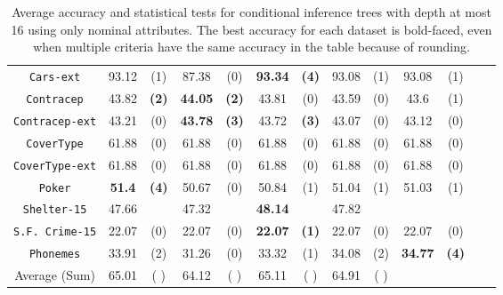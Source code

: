 \begin{table}
\begin{tabular}{c|cc|cc|cc|cc|cc|cc}
{\tt Cars-ext}      & 93.12      &  (1)              &   87.38      & (0)             & {\bf 93.34} &  {\bf (4)}           & 93.08       & (1)             & 93.08       & (1)         &             &             \\
{\tt Contracep}     & 43.82      &  {\bf (2)}        &   {\bf 44.05}& {\bf (2)}       &  43.81      &  (0)                 & 43.59       & (0)             & 43.6        & (1)         &             &             \\
{\tt Contracep-ext} & 43.21      &  (0)              &   {\bf 43.78}& {\bf (3)}       &  43.72      &  {\bf (3)}           & 43.07       & (0)             & 43.12       & (0)         &             &             \\
{\tt CoverType}     & 61.88      &  (0)              &   61.88      & (0)             &  61.88      &  (0)                 & 61.88       & (0)             & 61.88       & (0)         &             &             \\
{\tt CoverType-ext} & 61.88      &  (0)              &   61.88      & (0)             &  61.88      &  (0)                 & 61.88       & (0)             & 61.88       & (0)         &             &             \\
{\tt Poker}         & {\bf 51.4} &  {\bf (4)}        &   50.67      & (0)             &  50.84      &  (1)                 & 51.04       & (1)             & 51.03       & (1)         &             &             \\
{\tt Shelter-15}    & 47.66      &                   &   47.32      &                 & {\bf 48.14} &                      & 47.82       &                 &             &             &             &             \\
{\tt S.F. Crime-15} & 22.07      &  (0)              &   22.07      & (0)             & {\bf 22.07} &  {\bf (1)}           & 22.07       & (0)             & 22.07       & (0)         &             &             \\
{\tt Phonemes}      & 33.91      &  (2)              &   31.26      & (0)             &  33.32      &  (1)                 & 34.08       & (2)             & {\bf 34.77} & {\bf (4)}   &             &             \\
\hline
Average (Sum)       & 65.01      &  (  )             &   64.12      & (  )            &  65.11      &  (  )                & 64.91       & (  )            &             &             &             &
       \end{tabular}
        \caption{Average accuracy and statistical tests  for  conditional inference trees 
with depth at most 16 using only nominal attributes. The best accuracy for each dataset is bold-faced, even when multiple criteria have the same accuracy in the table because of rounding.}
\label{tab:ctree-16}
\normalsize
\end{table}


